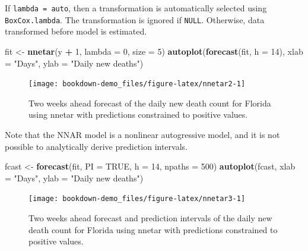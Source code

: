 \documentclass[]{book}
\newenvironment{Shaded}{\begin{snugshade}}{\end{snugshade}}
\newcommand{\KeywordTok}[1]{\textcolor[rgb]{0.13,0.29,0.53}{\textbf{#1}}}
\newcommand{\DataTypeTok}[1]{\textcolor[rgb]{0.13,0.29,0.53}{#1}}
\newcommand{\DecValTok}[1]{\textcolor[rgb]{0.00,0.00,0.81}{#1}}
\newcommand{\StringTok}[1]{\textcolor[rgb]{0.31,0.60,0.02}{#1}}
\newcommand{\OtherTok}[1]{\textcolor[rgb]{0.56,0.35,0.01}{#1}}
\newcommand{\OperatorTok}[1]{\textcolor[rgb]{0.81,0.36,0.00}{\textbf{#1}}}
\newcommand{\NormalTok}[1]{#1}
\begin{document}
If \texttt{lambda\ =\ auto}, then a transformation is automatically
selected using \texttt{BoxCox.lambda}. The transformation is ignored if
\texttt{NULL}. Otherwise, data transformed before model is estimated.

\begin{Shaded}
\begin{Highlighting}[]
\NormalTok{fit <-}\StringTok{ }\KeywordTok{nnetar}\NormalTok{(y }\OperatorTok{+}\StringTok{ }\DecValTok{1}\NormalTok{, }\DataTypeTok{lambda =} \DecValTok{0}\NormalTok{, }\DataTypeTok{size =} \DecValTok{5}\NormalTok{)}
\KeywordTok{autoplot}\NormalTok{(}\KeywordTok{forecast}\NormalTok{(fit, }\DataTypeTok{h =} \DecValTok{14}\NormalTok{), }\DataTypeTok{xlab =} \StringTok{"Days"}\NormalTok{, }
         \DataTypeTok{ylab =} \StringTok{"Daily new deaths"}\NormalTok{)}
\end{Highlighting}
\end{Shaded}

\begin{figure}

{\centering \texttt{[image: bookdown-demo\_files/figure-latex/nnetar2-1]} 

}

\caption{Two weeks ahead forecast of the daily new death count for Florida using nnetar with predictions constrained to positive values.}\label{fig:nnetar2}
\end{figure}

Note that the NNAR model is a nonlinear autogressive model, and it is
not possible to analytically derive prediction intervals.

\begin{Shaded}
\begin{Highlighting}[]
\NormalTok{fcast <-}\StringTok{ }\KeywordTok{forecast}\NormalTok{(fit, }\DataTypeTok{PI =} \OtherTok{TRUE}\NormalTok{, }\DataTypeTok{h =} \DecValTok{14}\NormalTok{, }\DataTypeTok{npaths =} \DecValTok{500}\NormalTok{)}
\KeywordTok{autoplot}\NormalTok{(fcast, }\DataTypeTok{xlab =} \StringTok{"Days"}\NormalTok{, }\DataTypeTok{ylab =} \StringTok{"Daily new deaths"}\NormalTok{)}
\end{Highlighting}
\end{Shaded}

\begin{figure}

{\centering \texttt{[image: bookdown-demo\_files/figure-latex/nnetar3-1]} 

}

\caption{Two weeks ahead forecast and prediction intervals of the daily new death count for Florida using nnetar with predictions constrained to positive values.}\label{fig:nnetar3}
\end{figure}
\end{document}
